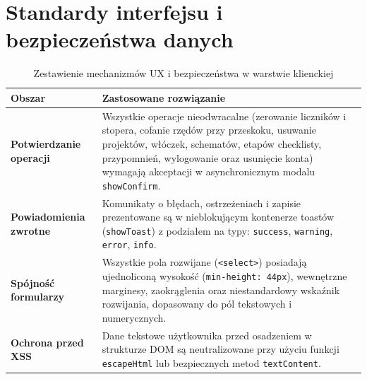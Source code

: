 \documentclass[11pt, a4paper]{article}
\begin{document}
\vspace{4ex}
\section{Standardy interfejsu i bezpieczeństwa danych}

\begin{table}[h!]
\centering
\caption{Zestawienie mechanizmów UX i bezpieczeństwa w warstwie klienckiej}
\vspace{6pt}
\begin{tabularx}{\textwidth}{>{\bfseries}l X}
\toprule
Obszar & Zastosowane rozwiązanie \\
\midrule
Potwierdzanie operacji & Wszystkie operacje nieodwracalne (zerowanie liczników i stopera, cofanie rzędów przy przeskoku, usuwanie projektów, włóczek, schematów, etapów checklisty, przypomnień, wylogowanie oraz usunięcie konta) wymagają akceptacji w asynchronicznym modalu \texttt{showConfirm}. \\
\addlinespace
Powiadomienia zwrotne & Komunikaty o błędach, ostrzeżeniach i zapisie prezentowane są w nieblokującym kontenerze toastów (\texttt{showToast}) z podziałem na typy: \texttt{success}, \texttt{warning}, \texttt{error}, \texttt{info}. \\
\addlinespace
Spójność formularzy & Wszystkie pola rozwijane (\texttt{<select>}) posiadają ujednoliconą wysokość (\texttt{min-height: 44px}), wewnętrzne marginesy, zaokrąglenia oraz niestandardowy wskaźnik rozwijania, dopasowany do pól tekstowych i numerycznych. \\
\addlinespace
Ochrona przed XSS & Dane tekstowe użytkownika przed osadzeniem w strukturze DOM są neutralizowane przy użyciu funkcji \texttt{escapeHtml} lub bezpiecznych metod \texttt{textContent}. \\
\bottomrule
\end{tabularx}
\end{table}

\newpage
\end{document}
